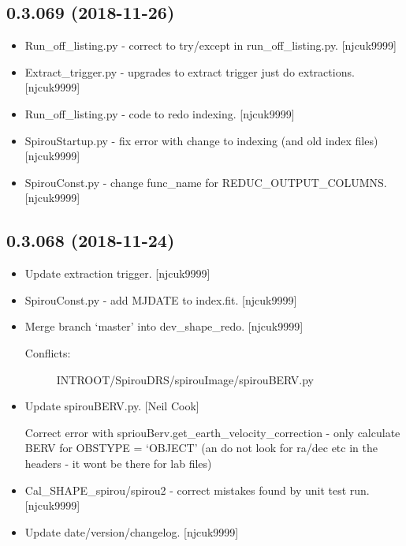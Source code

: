 \documentclass[a4paper,10pt,english]{report}
\begin{document}
\subsection{0.3.069 (2018-11-26)}
\label{\detokenize{misc/changelog:id252}}\begin{itemize}
\item {} 
Run\_off\_listing.py - correct to try/except in run\_off\_listing.py.
{[}njcuk9999{]}

\item {} 
Extract\_trigger.py - upgrades to extract trigger just do extractions.
{[}njcuk9999{]}

\item {} 
Run\_off\_listing.py - code to redo indexing. {[}njcuk9999{]}

\item {} 
SpirouStartup.py - fix error with change to indexing (and old index
files) {[}njcuk9999{]}

\item {} 
SpirouConst.py - change func\_name for REDUC\_OUTPUT\_COLUMNS.
{[}njcuk9999{]}

\end{itemize}


\subsection{0.3.068 (2018-11-24)}
\label{\detokenize{misc/changelog:id253}}\begin{itemize}
\item {} 
Update extraction trigger. {[}njcuk9999{]}

\item {} 
SpirouConst.py - add MJDATE to index.fit. {[}njcuk9999{]}

\item {} 
Merge branch ‘master’ into dev\_shape\_redo. {[}njcuk9999{]}
\begin{description}
\item[{Conflicts:}] \leavevmode
INTROOT/SpirouDRS/spirouImage/spirouBERV.py

\end{description}

\item {} 
Update spirouBERV.py. {[}Neil Cook{]}

Correct error with spriouBerv.get\_earth\_velocity\_correction - only calculate BERV for OBSTYPE = ‘OBJECT’ (an do not look for ra/dec etc in the headers - it wont be there for lab files)

\item {} 
Cal\_SHAPE\_spirou/spirou2 - correct mistakes found by unit test run.
{[}njcuk9999{]}

\item {} 
Update date/version/changelog. {[}njcuk9999{]}

\end{itemize}
\end{document}

